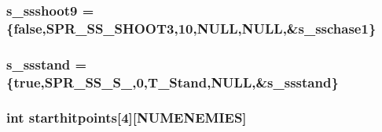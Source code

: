 \label{WL__ACT2_8C_a5e908bbb4160751f016f254339d35d1a}
\hypertarget{WL__ACT2_8C_ae2d91316bf6aa10b5688aebefe89cd2a}{
\subsubsection[{s\_\-ssshoot9}]{ {\bf s\_\-ssshoot9} = \{false,SPR\_\-SS\_\-SHOOT3,10,NULL,NULL,\&{\bf s\_\-sschase1}\}}}
\label{WL__ACT2_8C_ae2d91316bf6aa10b5688aebefe89cd2a}
\hypertarget{WL__ACT2_8C_af5abcc33c0e26090b5e4c3e516bc5241}{
\subsubsection[{s\_\-ssstand}]{ {\bf s\_\-ssstand} = \{true,SPR\_\-SS\_\-S\_,0,T\_\-Stand,NULL,\&{\bf s\_\-ssstand}\}}}
\label{WL__ACT2_8C_af5abcc33c0e26090b5e4c3e516bc5241}
\hypertarget{WL__ACT2_8C_abc6fe4c11f70870645f3e16028f40ee7}{
\subsubsection[{starthitpoints}]{\setlength{\rightskip}{0pt plus 5cm}int {\bf starthitpoints}\mbox{[}4\mbox{]}\mbox{[}NUMENEMIES\mbox{]}}}
\label{WL__ACT2_8C_abc6fe4c11f70870645f3e16028f40ee7}
